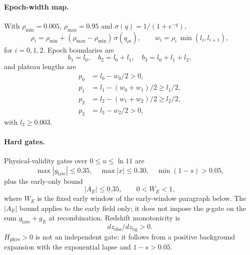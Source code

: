 \paragraph{Epoch-width map.}
With $\rho_{\min} = 0.005$, $\rho_{\max} = 0.95$ and
$\sigma(q) = 1/(1+e^{-q})$,
\begin{equation}
\rho_{i} = \rho_{\min}
  + (\rho_{\max} - \rho_{\min})\,\sigma(q_{\rho i}),
\qquad
w_{i} = \rho_{i}\,\min(l_{i}, l_{i+1}),
\end{equation}
for $i = 0,1,2$. Epoch boundaries are
\begin{equation}
b_{1} = l_{0}, \quad b_{2} = l_{0} + l_{1}, \quad
b_{3} = l_{0} + l_{1} + l_{2},
\end{equation}
and plateau lengths are
\begin{align}
p_{0} &= l_{0} - w_{0}/2 > 0, \\
p_{1} &= l_{1} - (w_{0}+w_{1})/2 \ge l_{1}/2, \\
p_{2} &= l_{2} - (w_{1}+w_{2})/2 \ge l_{2}/2, \\
p_{3} &= l_{3} - w_{2}/2 > 0,
\end{align}
with $l_{3} \ge 0.003$.

\paragraph{Hard gates.}
Physical-validity gates over $0 \le u \le \ln 11$ are
\begin{equation}
\max |g_{\mathrm{late}}| \le 0.35, \quad
\max |x| \le 0.30, \quad
\min (1 - s) > 0.05,
\end{equation}
plus the early-only bound
\begin{equation}
|A_{E}| \le 0.35, \qquad 0 < W_{E} < 1,
\end{equation}
where $W_{E}$ is the fixed early window of the early-window paragraph
below. The $|A_{E}|$ bound applies to the early field only; it does not
impose the $g$-gate on the sum $g_{\mathrm{late}} + g_{E}$ at
recombination. Redshift monotonicity is
\begin{equation}
\boxed{dz_{\mathrm{obs}}/dz_{\mathrm{bg}} > 0}.
\end{equation}
$H_{\mathrm{phys}} > 0$ is not an independent gate: it follows from a
positive background expansion with the exponential lapse and
$1 - s > 0.05$.

